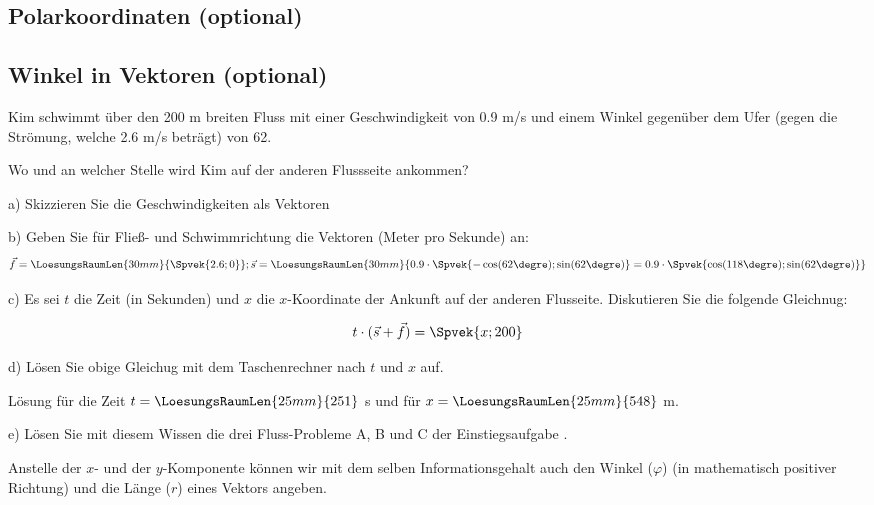 \subsection{Polarkoordinaten (optional)}


\newpage

\subsection{Winkel in Vektoren (optional)}

Kim schwimmt über den 200 m breiten Fluss mit einer Geschwindigkeit
von 0.9 m/s und einem Winkel gegenüber dem Ufer (gegen die Strömung,
welche 2.6 m/s beträgt)
von 62\degre.

Wo und an welcher Stelle wird Kim auf der anderen Flussseite ankommen?

a) Skizzieren Sie die Geschwindigkeiten als Vektoren


b) Geben Sie für Fließ- und Schwimmrichtung die Vektoren (Meter pro Sekunde)
an:
$$\vec{f} = \LoesungsRaumLen{30mm}{\Spvek{2.6; 0}}; \vec{s} =
\LoesungsRaumLen{30mm}{0.9\cdot{}\Spvek{-\cos(62\degre);\sin(62\degre)}
  =  0.9\cdot{}\Spvek{\cos(118\degre);\sin(62\degre)}}$$

c) Es sei $t$ die Zeit (in Sekunden) und $x$ die $x$-Koordinate der
Ankunft auf der anderen Flusseite. Diskutieren Sie die folgende
Gleichnug:

$$t\cdot{} (\vec{s}+\vec{f}) = \Spvek{x;200}$$

d) Lösen Sie obige Gleichug mit dem Taschenrechner nach $t$ und $x$
auf.

Lösung für die Zeit $t = \LoesungsRaumLen{25mm}{251}$ s und für $x =
\LoesungsRaumLen{25mm}{548}$ m.

\vspace{2mm}
e)
Lösen Sie mit diesem Wissen die drei Fluss-Probleme A, B und C der
Einstiegsaufgabe .
\newpage


Anstelle der $x$- und der $y$-Komponente können wir mit dem selben
Informationsgehalt auch den Winkel ($\varphi$)
(in mathematisch positiver Richtung) und die Länge ($r$) eines Vektors
angeben.


